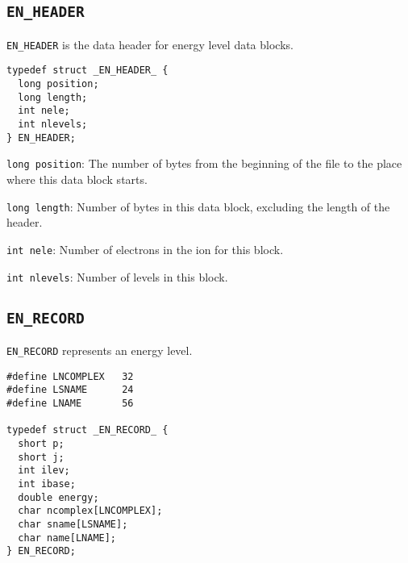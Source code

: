 \subsection{\texttt{EN\_HEADER}}
\texttt{EN\_HEADER} is the data header for energy level data blocks.

\begin{verbatim}
typedef struct _EN_HEADER_ {
  long position;
  long length;
  int nele;
  int nlevels;
} EN_HEADER;
\end{verbatim}

\begin{dbdesc}
\item[\texttt{long position}:] The number of bytes from the beginning of the
file to the place where this data block starts.
\item[\texttt{long length}:] Number of bytes in this data block, excluding the
length of the header.
\item[\texttt{int nele}:] Number of electrons in the ion for this block.
\item[\texttt{int nlevels}:] Number of levels in this block.
\end{dbdesc}

\subsection{\texttt{EN\_RECORD}}
\texttt{EN\_RECORD} represents an energy level.

\begin{verbatim}
#define LNCOMPLEX   32
#define LSNAME      24
#define LNAME       56

typedef struct _EN_RECORD_ {
  short p;
  short j;
  int ilev;
  int ibase;
  double energy;
  char ncomplex[LNCOMPLEX];
  char sname[LSNAME];
  char name[LNAME];
} EN_RECORD;
\end{verbatim}

